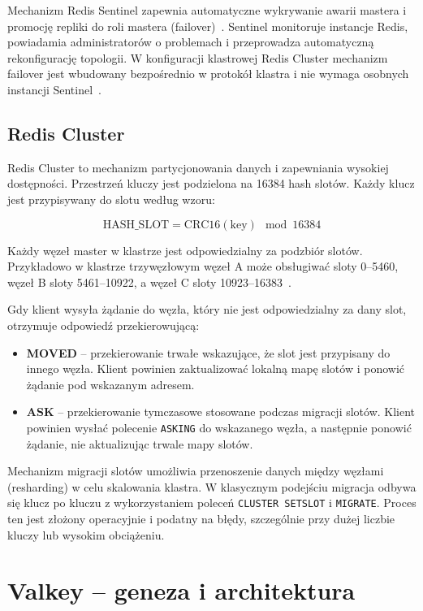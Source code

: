 Mechanizm Redis Sentinel zapewnia automatyczne wykrywanie awarii mastera i promocję repliki do roli mastera (failover)~\cite{redisSentinel}. Sentinel monitoruje instancje Redis, powiadamia administratorów o problemach i przeprowadza automatyczną rekonfigurację topologii. W konfiguracji klastrowej Redis Cluster mechanizm failover jest wbudowany bezpośrednio w protokół klastra i nie wymaga osobnych instancji Sentinel~\cite{redisClusterSpec}.

\subsection{Redis Cluster}

Redis Cluster to mechanizm partycjonowania danych i zapewniania wysokiej dostępności. Przestrzeń kluczy jest podzielona na 16384 hash slotów. Każdy klucz jest przypisywany do slotu według wzoru:

\[
\text{HASH\_SLOT} = \text{CRC16}(\text{key}) \mod 16384
\]

Każdy węzeł master w klastrze jest odpowiedzialny za podzbiór slotów. Przykładowo w klastrze trzywęzłowym węzeł A może obsługiwać sloty 0--5460, węzeł B sloty 5461--10922, a węzeł C sloty 10923--16383~\cite{redisClusterSpec}.

Gdy klient wysyła żądanie do węzła, który nie jest odpowiedzialny za dany slot, otrzymuje odpowiedź przekierowującą:

\begin{itemize}
    \item \textbf{MOVED} -- przekierowanie trwałe wskazujące, że slot jest przypisany do innego węzła. Klient powinien zaktualizować lokalną mapę slotów i ponowić żądanie pod wskazanym adresem.
    \item \textbf{ASK} -- przekierowanie tymczasowe stosowane podczas migracji slotów. Klient powinien wysłać polecenie \texttt{ASKING} do wskazanego węzła, a następnie ponowić żądanie, nie aktualizując trwale mapy slotów.
\end{itemize}

Mechanizm migracji slotów umożliwia przenoszenie danych między węzłami (resharding) w celu skalowania klastra. W klasycznym podejściu migracja odbywa się klucz po kluczu z wykorzystaniem poleceń \texttt{CLUSTER SETSLOT} i \texttt{MIGRATE}. Proces ten jest złożony operacyjnie i podatny na błędy, szczególnie przy dużej liczbie kluczy lub wysokim obciążeniu.

\section{Valkey -- geneza i architektura}\label{sec:valkey}

